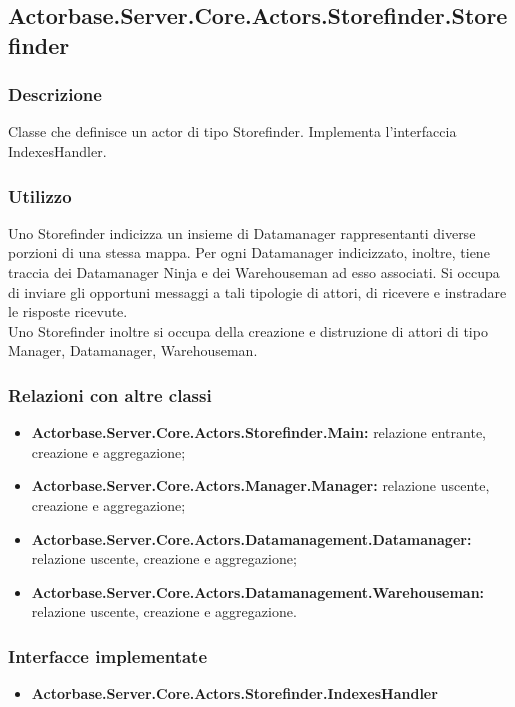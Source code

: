 \documentclass[a4paper]{article}
\begin{document}
		\subsection{Actorbase.Server.Core.Actors.Storefinder.Storefinder}
			\subsubsection{Descrizione}
				Classe che definisce un actor di tipo Storefinder. Implementa l'interfaccia IndexesHandler.
			\subsubsection{Utilizzo}
				Uno Storefinder indicizza un insieme di Datamanager rappresentanti diverse porzioni di una stessa mappa. Per ogni Datamanager indicizzato, inoltre, tiene traccia dei Datamanager Ninja e dei Warehouseman ad esso associati. Si occupa di inviare gli opportuni messaggi a tali tipologie di attori, di ricevere e instradare le risposte ricevute. 
				\\ Uno Storefinder inoltre si occupa della creazione e distruzione di attori di tipo Manager, Datamanager, Warehouseman.
			\subsubsection{Relazioni con altre classi}
			\begin{itemize}
				\item \textbf{Actorbase.Server.Core.Actors.Storefinder.Main:} relazione entrante, creazione e aggregazione;
				\item \textbf{Actorbase.Server.Core.Actors.Manager.Manager:} relazione uscente, creazione e aggregazione;
				\item \textbf{Actorbase.Server.Core.Actors.Datamanagement.Datamanager:} relazione uscente, creazione e aggregazione;
				\item \textbf{Actorbase.Server.Core.Actors.Datamanagement.Warehouseman:} relazione uscente, creazione e aggregazione.
			\end{itemize}
			\subsubsection{Interfacce implementate}
			\begin{itemize}
				\item \textbf{Actorbase.Server.Core.Actors.Storefinder.IndexesHandler} 
			\end{itemize}
\end{document}
